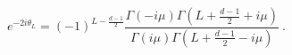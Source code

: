 \begin{equation}
e^{-2i\theta_L}=(-1)^{L-\frac{d-1}{2}}
\frac{\Gamma(-i\mu)\Gamma\left(L+\frac{d-1}{2}
+i\mu\right)}
{\Gamma(i\mu)\Gamma\left(L+\frac{d-1}{2}-i\mu\right)
} \ .
\end{equation}

